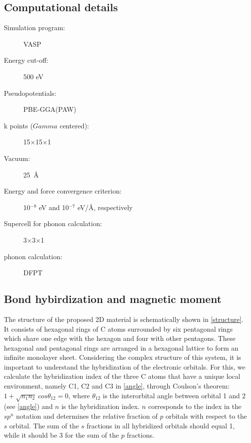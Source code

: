 \subsection{Computational details}
\begin{footnotesize}
\begin{description}
\item[Simulation program:] VASP
\item[Energy cut-off:] 500 eV
\item[Pseudopotentials:] PBE-GGA(PAW)
\item[k points ($Gamma$ centered):] 15$\times$15$\times$1
\item[Vacuum:] 25~\AA
\item[Energy and force convergence criterion:] 10$^{-8}$ eV and 10$^{-7}$ eV/\AA, respectively
\item[Supercell for phonon calculation:] 3$\times$3$\times$1
\item[phonon calculation:] DFPT
\end{description}
\end{footnotesize}

\subsection{Bond hybirdization and magnetic moment \label{res}}

The structure of the proposed 2D material is schematically shown in \autoref{structure}. It consists of hexagonal rings of C atoms surrounded by six pentagonal rings which share one edge with the hexagon and four with other pentagons. These hexagonal and pentagonal rings are arranged in a hexagonal lattice to form an infinite monolayer sheet. Considering the complex structure of this system, it is important to understand the hybridization of the electronic orbitals. For this, we calculate the hybridization index of the three C atoms that have a unique local environment, namely C1, C2 and C3 in \autoref{angle}, through Coulson's theorem: $1+\sqrt{n_1n_2}~cos\theta_{12}=0$, where $\theta_{12}$ is the interorbital angle between orbital 1 and 2 (see \autoref{angle}) and $n$ is the hybridization index.  $n$ corresponds to the index in the $sp^n$ notation and determines the relative fraction of $p$ orbitals with respect to the $s$ orbital. The sum of the $s$ fractions in all hybridized orbitals should equal 1, while it should be 3 for the sum of the $p$ fractions. 

